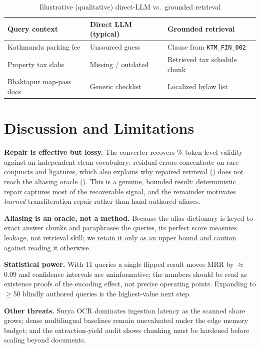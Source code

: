 \documentclass[conference]{IEEEtran}
\begin{document}
\begin{table}[t]
\caption{Illustrative (qualitative) direct-LLM vs.\ grounded retrieval}
\label{tab:llm-vs-rag}
\centering
\footnotesize
\begin{tabular}{p{2.1cm}p{2.4cm}p{2.4cm}}
\toprule
\textbf{Query context} & \textbf{Direct LLM (typical)} & \textbf{Grounded retrieval} \\
\midrule
Kathmandu parking fee & Unsourced guess & Clause from \texttt{KTM\_FIN\_002} \\
Property tax slabs & Missing / outdated & Retrieved tax schedule chunk \\
Bhaktapur map-pass docs & Generic checklist & Localized bylaw list \\
\bottomrule
\end{tabular}
\end{table}

\section{Discussion and Limitations}
\textbf{Repair is effective but lossy.} The converter recovers \repairValidity{}\% token-level validity against an independent clean vocabulary; residual errors concentrate on rare conjuncts and ligatures, which also explains why repaired retrieval (\repRecall{}) does not reach the aliasing oracle (\aliRecall{}). This is a genuine, bounded result: deterministic repair captures most of the recoverable signal, and the remainder motivates \emph{learned} transliteration repair rather than hand-authored aliases.

\textbf{Aliasing is an oracle, not a method.} Because the alias dictionary is keyed to exact answer chunks and paraphrases the queries, its perfect score measures leakage, not retrieval skill; we retain it only as an upper bound and caution against reading it otherwise.

\textbf{Statistical power.} With 11 queries a single flipped result moves MRR by $\approx$0.09 and confidence intervals are uninformative; the numbers should be read as existence proofs of the encoding effect, not precise operating points. Expanding to $\geq$50 blindly authored queries is the highest-value next step.

\textbf{Other threats.} Surya OCR dominates ingestion latency as the scanned share grows; dense multilingual baselines remain unevaluated under the edge memory budget; and the extraction-yield audit shows chunking must be hardened before scaling beyond \corpusDocs{} documents.
\end{document}
